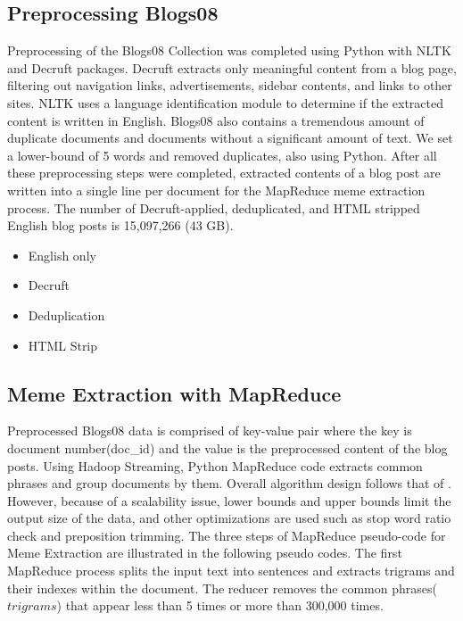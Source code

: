 \documentclass{sig-alternate}
\begin{document}
\subsection{Preprocessing Blogs08}

Preprocessing of the Blogs08 Collection was completed using Python with NLTK and Decruft packages. Decruft extracts only meaningful content from a blog page, filtering out navigation links, advertisements, sidebar contents, and links to other sites. NLTK uses a language identification module to determine if the extracted content is written in English. Blogs08 also contains a tremendous amount of duplicate documents and documents without a significant amount of text. We set a lower-bound of 5 words and removed duplicates, also using Python. After all these preprocessing steps were completed, extracted contents of a blog post are written into a single line per document for the MapReduce meme extraction process. The number of Decruft-applied, deduplicated, and HTML stripped English blog posts is 15,097,266 (43 GB).

\begin{itemize}
\item English only
\item Decruft
\item Deduplication
\item HTML Strip
\end{itemize}


\subsection{Meme Extraction with MapReduce}

Preprocessed Blogs08 data is comprised of key-value pair where the key is document number(doc\_id) and the value is the preprocessed content of the blog posts. Using Hadoop Streaming, Python MapReduce code extracts common phrases and group documents by them. Overall algorithm design follows that of \cite{Kolak2008}. However, because of a scalability issue, lower bounds and upper bounds limit the output size of the data, and other optimizations are used such as stop word ratio check and preposition trimming. The three steps of MapReduce pseudo-code for Meme Extraction are illustrated in the following pseudo codes. The first MapReduce process splits the input text into sentences and extracts trigrams and their indexes within the document. The reducer removes the common phrases($trigrams$) that appear less than 5 times or more than 300,000 times.
\end{document}
